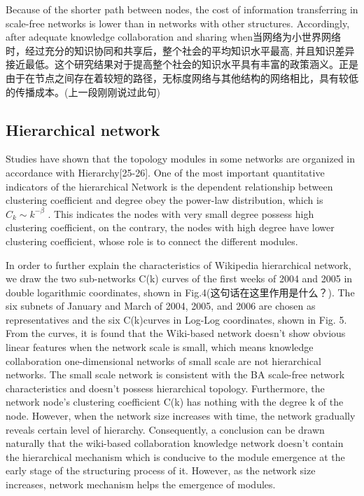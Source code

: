 \documentclass{elsarticle}
\begin{document}
Because of the shorter path between nodes, the cost of information transferring in scale-free networks is lower than in networks with other structures. Accordingly, after adequate knowledge collaboration and sharing when当网络为小世界网络时，经过充分的知识协同和共享后，整个社会的平均知识水平最高, 并且知识差异接近最低。这个研究结果对于提高整个社会的知识水平具有丰富的政策涵义。正是由于在节点之间存在着较短的路径，无标度网络与其他结构的网络相比，具有较低的传播成本。(上一段刚刚说过此句)

\subsection{Hierarchical network}
\label{sec:hierarchical-network}

Studies have shown that the topology modules in some networks are
organized in accordance with Hierarchy[25-26]. One of the most
important quantitative indicators of the hierarchical Network is the
dependent relationship between clustering coefficient and degree obey
the power-law distribution, which is $C_k\sim k^{-\beta}$  . This indicates the nodes with very small degree possess high clustering coefficient, on the contrary, the nodes with high degree have lower clustering coefficient, whose role is to connect the different modules.

In order to further explain the characteristics of Wikipedia
hierarchical network, we draw the two sub-networks C(k) curves of the
first weeks of 2004 and 2005 in double logarithmic coordinates, shown
in Fig.4(这句话在这里作用是什么？). The six subnets of January and
March of 2004, 2005, and 2006 are chosen as representatives and the
six C(k)curves in Log-Log coordinates, shown in Fig. 5. From the
curves, it is found that the Wiki-based network doesn’t show obvious
linear features when the network scale is small, which means knowledge
collaboration one-dimensional networks of small scale are not
hierarchical networks. The small scale network is consistent with the
BA scale-free network characteristics and doesn’t possess hierarchical
topology. Furthermore, the network node’s clustering coefficient C(k)
has nothing with the degree k of the node. However, when the network
size increases with time, the network gradually reveals certain level
of hierarchy. Consequently, a conclusion can be drawn naturally that
the wiki-based collaboration knowledge network doesn’t contain the
hierarchical mechanism which is conducive to the module emergence at
the early stage of the structuring process of it. However, as the
network size increases, network mechanism helps the emergence of
modules. 
\end{document}
